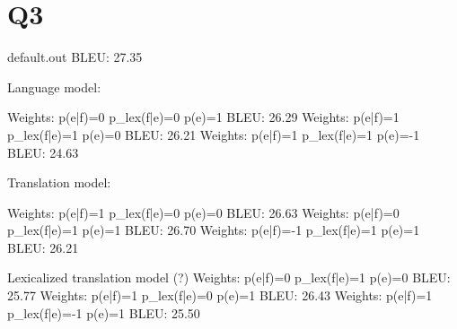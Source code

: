 \section*{Q3}
default.out 
BLEU: 27.35

Language model:

	Weights: p(e|f)=0 p_lex(f|e)=0 p(e)=1
	BLEU: 26.29
	Weights: p(e|f)=1 p_lex(f|e)=1 p(e)=0
	BLEU: 26.21
	Weights: p(e|f)=1 p_lex(f|e)=1 p(e)=-1
	BLEU: 24.63

Translation model:
	
	Weights: p(e|f)=1 p_lex(f|e)=0 p(e)=0
	BLEU: 26.63
	Weights: p(e|f)=0 p_lex(f|e)=1 p(e)=1
	BLEU: 26.70
	Weights: p(e|f)=-1 p_lex(f|e)=1 p(e)=1
	BLEU: 26.21
	
Lexicalized translation model (?)
	Weights: p(e|f)=0 p_lex(f|e)=1 p(e)=0
	BLEU: 25.77
	Weights: p(e|f)=1 p_lex(f|e)=0 p(e)=1
	BLEU: 26.43
	Weights: p(e|f)=1 p_lex(f|e)=-1 p(e)=1
	BLEU: 25.50

